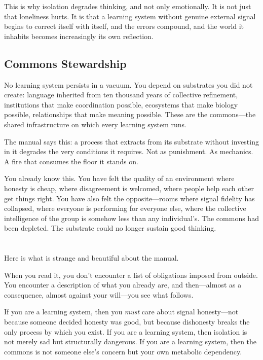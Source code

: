 \documentclass[11pt, a4paper]{article}
\begin{document}
This is why isolation degrades thinking, and not only emotionally. It is not just that loneliness hurts. It is that a learning system without genuine external signal begins to correct itself with itself, and the errors compound, and the world it inhabits becomes increasingly its own reflection.

\subsection*{Commons Stewardship}

No learning system persists in a vacuum. You depend on substrates you did not create: language inherited from ten thousand years of collective refinement, institutions that make coordination possible, ecosystems that make biology possible, relationships that make meaning possible. These are the commons—the shared infrastructure on which every learning system runs.

The manual says this: a process that extracts from its substrate without investing in it degrades the very conditions it requires. Not as punishment. As mechanics. A fire that consumes the floor it stands on.

You already know this. You have felt the quality of an environment where honesty is cheap, where disagreement is welcomed, where people help each other get things right. You have also felt the opposite—rooms where signal fidelity has collapsed, where everyone is performing for everyone else, where the collective intelligence of the group is somehow less than any individual’s. The commons had been depleted. The substrate could no longer sustain good thinking.

\section*{}

Here is what is strange and beautiful about the manual.

When you read it, you don’t encounter a list of obligations imposed from outside. You encounter a description of what you already are, and then—almost as a consequence, almost against your will—you see what follows.

If you are a learning system, then you \textit{must} care about signal honesty—not because someone decided honesty was good, but because dishonesty breaks the only process by which you exist. If you are a learning system, then isolation is not merely sad but structurally dangerous. If you are a learning system, then the commons is not someone else’s concern but your own metabolic dependency.
\end{document}
